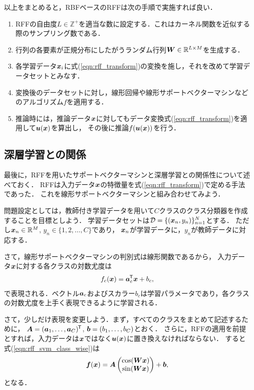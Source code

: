 以上をまとめると，RBFベースのRFFは次の手順で実施すれば良い．
\begin{enumerate}
    \item RFFの自由度$L \in \mathbb{Z}^{+}$を適当な数に設定する．これはカーネル関数を近似する際のサンプリング数である．
    \item 行列の各要素が正規分布にしたがうランダム行列$\boldsymbol{W} \in \mathbb{R}^{L \times M}$を生成する．
    \item 各学習データ$\boldsymbol{x}_i$に式(\ref{eqn:rff_transform})の変換を施し，それを改めて学習データセットとみなす．
    \item 変換後のデータセットに対し，線形回帰や線形サポートベクターマシンなどのアルゴリズム$f$を適用する．
    \item 推論時には，推論データ$\boldsymbol{x}$に対してもデータ変換式(\ref{eqn:rff_transform})を適用して$\boldsymbol{u}(\boldsymbol{x})$を算出し，
          その後に推論$f(\boldsymbol{u}(\boldsymbol{x}))$を行う．
\end{enumerate}

\subsection{深層学習との関係}

最後に，RFFを用いたサポートベクターマシンと深層学習との関係性について述べておく．
RFFは入力データ$\boldsymbol{x}$の特徴量を式(\ref{eqn:rff_transform})で定める手法であった．
これを線形サポートベクターマシンと組み合わせてみよう．

問題設定としては，教師付き学習データを用いて$C$クラスのクラス分類器を作成することを目標としよう．
学習データセットは$\mathcal{D} = \{ (\boldsymbol{x}_n, y_n) \}_{n=1}^{N}$とする．
ただし$\boldsymbol{x}_n \in \mathbb{R}^M$, $y_n \in \{1, 2, \ldots, C\}$であり，
$\boldsymbol{x}_n$が学習データに，$y_n$が教師データに対応する．

さて，線形サポートベクターマシンの判別式は線形関数であるから，
入力データ$\boldsymbol{x}$に対する各クラスの対数尤度は
\begin{equation}
    f_c(\boldsymbol{x}) = \boldsymbol{a}_c^{\mkern-1.5mu\mathsf{T}} \boldsymbol{x} + b_c,
    \label{eqn:rff_svm_class_wise}
\end{equation}
で表現される．ベクトル$\boldsymbol{a}_c$およびスカラー$b_c$は学習パラメータであり，各クラスの対数尤度を上手く表現できるように学習される．

さて，少しだけ表現を変更しよう．まず，すべてのクラスをまとめて記述するために，
$\boldsymbol{A} = (\boldsymbol{a}_1, \ldots, \boldsymbol{a}_C)^{\mkern-1.5mu\mathsf{T}}$, $\boldsymbol{b} = (b_1, \ldots, b_C)$とおく．
さらに，RFFの適用を前提とすれば，入力データは$\boldsymbol{x}$ではなく$\boldsymbol{u}(\boldsymbol{x})$に置き換えなければならない．
すると式(\ref{eqn:rff_svm_class_wise})は
\begin{equation}
    \boldsymbol{f}(\boldsymbol{x}) = \boldsymbol{A}
    \begin{pmatrix}
        \cos(\boldsymbol{Wx}) \\ \sin(\boldsymbol{Wx})
    \end{pmatrix}
    + \boldsymbol{b},
\end{equation}
となる．

